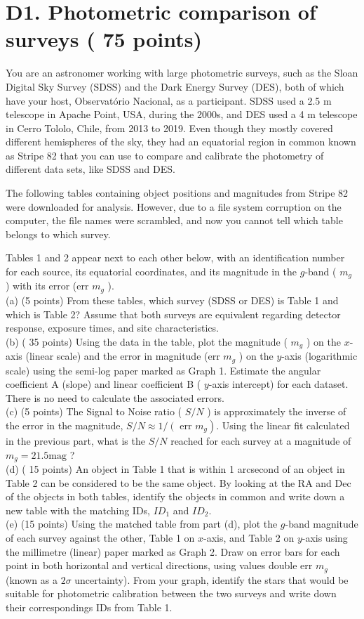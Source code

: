 \documentclass[10pt]{article}
\begin{document}
\section*{D1. Photometric comparison of surveys ( $\mathbf{7 5}$ points)}
You are an astronomer working with large photometric surveys, such as the Sloan Digital Sky Survey (SDSS) and the Dark Energy Survey (DES), both of which have your host, Observatório Nacional, as a participant. SDSS used a 2.5 m telescope in Apache Point, USA, during the 2000s, and DES used a 4 m telescope in Cerro Tololo, Chile, from 2013 to 2019. Even though they mostly covered different hemispheres of the sky, they had an equatorial region in common known as Stripe 82 that you can use to compare and calibrate the photometry of different data sets, like SDSS and DES.

The following tables containing object positions and magnitudes from Stripe 82 were downloaded for analysis. However, due to a file system corruption on the computer, the file names were scrambled, and now you cannot tell which table belongs to which survey.

Tables 1 and 2 appear next to each other below, with an identification number for each source, its equatorial coordinates, and its magnitude in the $g$-band ( $m_{g}$ ) with its error (err $m_{g}$ ).\\
(a) (5 points) From these tables, which survey (SDSS or DES) is Table 1 and which is Table 2? Assume that both surveys are equivalent regarding detector response, exposure times, and site characteristics.\\
(b) ( 35 points) Using the data in the table, plot the magnitude ( $m_{g}$ ) on the $x$-axis (linear scale) and the error in magnitude (err $m_{g}$ ) on the $y$-axis (logarithmic scale) using the semi-log paper marked as Graph 1. Estimate the angular coefficient A (slope) and linear coefficient B ( $y$-axis intercept) for each dataset. There is no need to calculate the associated errors.\\
(c) (5 points) The Signal to Noise ratio ( $S / N$ ) is approximately the inverse of the error in the magnitude, $S / N \approx 1 /\left(\right.$ err $\left.m_{g}\right)$. Using the linear fit calculated in the previous part, what is the $S / N$ reached for each survey at a magnitude of $m_{g}=21.5 \mathrm{mag}$ ?\\
(d) ( 15 points) An object in Table 1 that is within 1 arcsecond of an object in Table 2 can be considered to be the same object. By looking at the RA and Dec of the objects in both tables, identify the objects in common and write down a new table with the matching IDs, $I D_{1}$ and $I D_{2}$.\\
(e) (15 points) Using the matched table from part (d), plot the $g$-band magnitude of each survey against the other, Table 1 on $x$-axis, and Table 2 on $y$-axis using the millimetre (linear) paper marked as Graph 2. Draw on error bars for each point in both horizontal and vertical directions, using values double err $m_{g}$ (known as a $2 \sigma$ uncertainty). From your graph, identify the stars that would be suitable for photometric calibration between the two surveys and write down their correspondings IDs from Table 1.
\end{document}

